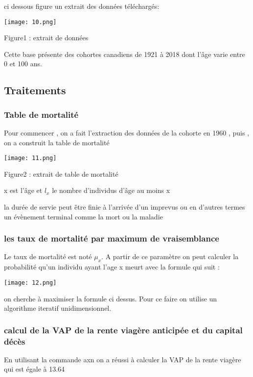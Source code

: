 \documentclass{article}
\begin{document}
{{\large ci dessous figure un extrait des données téléchargés:}

\texttt{[image: 10.png]}
\begin{center}
    {\large Figure1 : extrait de données}
\end{center}

{\large Cette base présente des cohortes canadiens de 1921 à 2018 dont l’âge varie entre 0 et 100 ans.}

\subsection{Traitements}
\subsubsection{Table de mortalité}
{\large Pour commencer , on a fait l'extraction des données de la cohorte en 1960 , puis , on a construit la table de mortalité}

\texttt{[image: 11.png]}
\begin{center}
    {\large Figure2 : extrait de table de mortalité}
\end{center}

{\large x est l'âge et $l_{x}$ le nombre d'individus d'âge au moins x}

{\large la durée de servie peut être finie à l'arrivée d'un imprevus ou en d'autres termes un évènement terminal comme la mort ou la maladie}

\subsubsection{les taux de mortalité par maximum de vraisemblance}
{\large Le taux de mortalité est noté $\mu_{x}$. A partir de ce paramètre on peut calculer la probabilité qu'un individu ayant l'age x meurt avec la formule qui suit :}

\texttt{[image: 12.png]}

{\large  on cherche à maximiser la formule ci dessus. Pour ce faire on utilise un algorithme iteratif unidimensionnel.}


\subsubsection{calcul de la VAP de la rente viagère anticipée et du capital décès}
{\large En utilisant la commande axn on a réussi à calculer la VAP de la rente viagère qui est égale à 13.64 }

}
\end{document}
